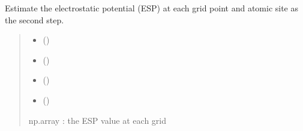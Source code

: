 \documentclass[letterpaper,10pt,english]{sphinxmanual}
\begin{document}

\begin{fulllineitems}
\label{\detokenize{fcdft.solvent:fcdft.solvent.esp.esp_esp}}
\pysigstartsignatures
\pysiglinewithargsret
{}
{\sphinxparamcomma {}\sphinxparamcomma {}\sphinxparamcomma {}}
{}
\pysigstopsignatures
\sphinxAtStartPar
Estimate the electrostatic potential (ESP) at each grid point and atomic site as the second step.
\begin{quote}\begin{description}
\begin{itemize}
\item {} 
\sphinxAtStartPar
{}\sphinxstyleliteralstrong{\sphinxupquote{(}}\sphinxstyleliteralstrong{\sphinxupquote{)}} ()

\item {} 
\sphinxAtStartPar
{} ()

\item {} 
\sphinxAtStartPar
\sphinxstyleliteralstrong{\sphinxupquote{(}} ()

\item {} 
\sphinxAtStartPar
{}\sphinxstyleliteralstrong{\sphinxupquote{)}} ()

\end{itemize}

\sphinxAtStartPar
{}

\sphinxAtStartPar
np.array : the ESP value at each grid

\end{description}\end{quote}

\end{fulllineitems}
\end{document}
